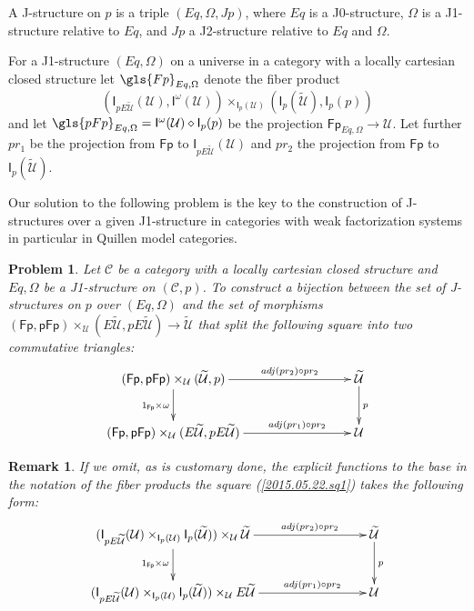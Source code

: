 \documentclass[12pt]{article}
\numberwithin{equation}{section}
\newenvironment{eq}{\begin{equation}}{\end{equation}}
\newtheorem{remark}[proposition]{Remark}
\newtheorem{problem}[proposition]{Problem}
\newcommand{\llabel}[1]{\label{#1}}
\newcommand{\sr}{\rightarrow}
\newcommand{\wt}{\widetilde}
\newcommand{\dd}{\diamond}
\newcommand{\id}{1}            %
\newcommand{\U}{\mathcal{U}}
\newcommand{\I}{\mathsf{I}}
\newcommand{\Fp}{\mathsf{Fp}}
\newcommand{\pFp}{\mathsf{pFp}}
\begin{document}
A J-structure on $p$ is a triple $(Eq,\Omega,Jp)$, where $Eq$ is a J0-structure,
$\Omega$ is a J1-structure relative to $Eq$, and $Jp$ a J2-structure relative to
$Eq$ and $\Omega$.

For a J1-structure $(Eq,\Omega)$ on a universe in a category with a locally
cartesian closed structure let $\gls{Fp}_{Eq,\Omega}$ denote the fiber product
%
$$(\I_{pE\wt{\U}}(\U), \I^{\omega}(\U)) \times_{\I_p(\U)} (\I_p(\wt{\U}), \I_p(p))$$
%
and let $\gls{pFp}_{Eq,\Omega}=\I^{\omega}(\U)\dd \I_p(p)$ be the projection
$\Fp_{Eq,\Omega}\sr \U$. Let further $pr_1$ be the projection from $\Fp$ to
$\I_{pE\wt{\U}}(\U)$ and $pr_2$ the projection from $\Fp$ to $\I_p(\wt{\U})$.

Our solution to the following problem is the key to the construction of
J-structures over a given J1-structure in categories with weak factorization
systems in particular in Quillen model categories.
%
\begin{problem}
\llabel{2015.05.12.l1} Let $\mathcal C$ be a category with a locally cartesian
closed structure and $Eq,\Omega$ be a J1-structure on $({\mathcal C},p)$. To
construct a bijection between the set of J-structures on $p$ over $(Eq,\Omega)$
and the set of morphisms $(\Fp,\pFp)\times_\U(E\wt{\U},pE\wt{\U})\sr \wt{\U}$ that
split the following square into two commutative triangles:
%
\begin{eq}\llabel{2015.05.22.sq1}
\begin{xy}
          \xymatrix@C=7pc{ (\Fp,\pFp)\times_\U(\wt{\U},p) \ar[r]^-{adj(pr_2)\circ
              pr_2} \ar[d]_{\id_{\Fp}\times \omega} & \wt{\U}
            \ar[d]^{p}\\ (\Fp,\pFp)\times_\U(E\wt{\U},pE\wt{\U})
            \ar[r]^-{adj(pr_1)\circ pr_2} & \U }
\end{xy}
\end{eq}%
%
\end{problem}
%
\begin{remark}\rm
If we omit, as is customary done, the explicit functions to the base in the
notation of the fiber products the square (\ref{2015.05.22.sq1}) takes the
following form:
%
\begin{eq}\llabel{2017.08.16.sq1}
\begin{xy}
          \xymatrix@C=7pc{ (\I_{pE\wt{\U}}(\U)\times_{\I_p(\U)}
            \I_p(\wt{\U}))\times_\U\wt{\U} \ar[r]^-{adj(pr_2)\circ pr_2}
            \ar[d]_{\id_{\Fp}\times \omega} & \wt{\U}
            \ar[d]^{p}\\ (\I_{pE\wt{\U}}(\U)\times_{\I_p(\U)} \I_p(\wt{\U}))\times_\U
            E\wt{\U} \ar[r]^-{adj(pr_1)\circ pr_2} & \U }
\end{xy}
\end{eq}%




\end{remark}
\end{document}
